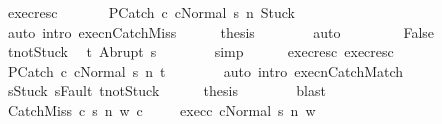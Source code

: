 \begin{isabellebody}
\ exec{\isacharunderscore}res{\isacharunderscore}c{}\ \isanewline
\ \ \ \ \isamarkupfalse%
\ {\isachardoublequoteopen}{\isasymGamma}{\isacharbar}\isactrlbsub P\isactrlesub {\isasymturnstile}{\isasymlangle}Catch\ c{}\ c{}{\isacharcomma}Normal\ s{\isasymrangle}\ {\isacharequal}n{\isasymRightarrow}\ Stuck{\isachardoublequoteclose}\isanewline
\ \ \ \ \ \ \isamarkupfalse%
\ {\isacharparenleft}auto\ intro{\isacharcolon}\ execn{\isachardot}CatchMiss{\isacharparenright}\isanewline
\ \ \ \ \isamarkupfalse%
\ {\isacharquery}thesis\isanewline
\ \ \ \ \ \ \isamarkupfalse%
\ auto\isanewline
\ \ \isamarkupfalse%
\isanewline
\ \ \ \ \isamarkupfalse%
\ False\isanewline
\ \ \ \ \isamarkupfalse%
\ t{\isacharprime}{\isacharunderscore}notStuck\ \isamarkupfalse%
\ {\isachardoublequoteopen}t{\isacharprime}{\isacharequal}\ Abrupt\ s{\isacharprime}{\isachardoublequoteclose}\isanewline
\ \ \ \ \ \ \isamarkupfalse%
\ simp\isanewline
\ \ \ \ \isamarkupfalse%
\ exec{\isacharunderscore}res{\isacharunderscore}c{}\ exec{\isacharunderscore}res{\isacharunderscore}c{}\isanewline
\ \ \ \ \isamarkupfalse%
\ {\isachardoublequoteopen}{\isasymGamma}{\isacharbar}\isactrlbsub P\isactrlesub {\isasymturnstile}{\isasymlangle}Catch\ c{}\ c{}{\isacharcomma}Normal\ s{\isasymrangle}\ {\isacharequal}n{\isasymRightarrow}\ t{\isacharprime}{\isacharprime}{\isachardoublequoteclose}\isanewline
\ \ \ \ \ \ \isamarkupfalse%
\ {\isacharparenleft}auto\ intro{\isacharcolon}\ execn{\isachardot}CatchMatch{\isacharparenright}\isanewline
\ \ \ \ \isamarkupfalse%
\ s{\isacharprime}{\isacharprime}{\isacharunderscore}Stuck\ s{\isacharprime}{\isacharprime}{\isacharunderscore}Fault\ t{\isacharprime}{\isacharprime}{\isacharunderscore}notStuck\isanewline
\ \ \ \ \isamarkupfalse%
\ {\isacharquery}thesis\isanewline
\ \ \ \ \ \ \isamarkupfalse%
\ blast\isanewline
\ \ \isamarkupfalse%
\isanewline
{}\isamarkupfalse%
\isanewline
\ \ \isamarkupfalse%
\ {\isacharparenleft}CatchMiss\ c{}\ s\ n\ w\ c{}{\isacharparenright}\ \isanewline
\ \ \isamarkupfalse%
\ exec{\isacharunderscore}c{}{\isacharcolon}\ {\isachardoublequoteopen}{\isasymGamma}{\isasymturnstile}{\isasymlangle}c{}{\isacharcomma}Normal\ s{\isasymrangle}\ {\isacharequal}n{\isasymRightarrow}\ w{\isachardoublequoteclose}\ \isamarkupfalse%

\end{isabellebody}
